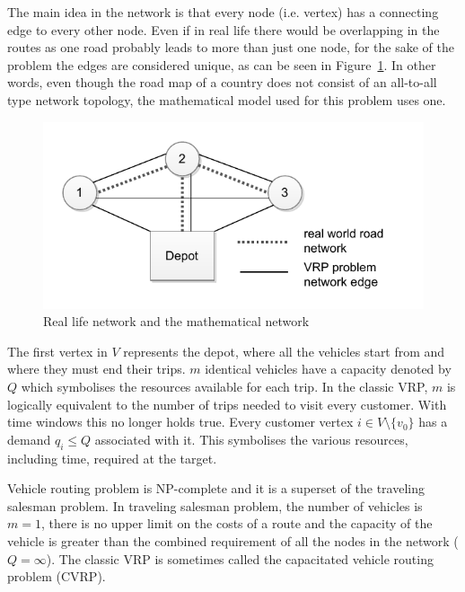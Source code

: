 The main idea in the network is that every node (i.e. vertex) has a connecting edge to every other node. Even if in real life there would be overlapping in the routes as one road probably leads to more than just one node, for the sake of the problem the edges are considered unique, as can be seen in Figure~\ref{fig:reallifenetwork}. In other words, even though the road map of a country does not consist of an all-to-all type network topology, the mathematical model used for this problem uses one. 

\begin{figure}[h]
  \begin{center}
    \includegraphics{images/simplenetwork.pdf}
    \caption{Real life network and the mathematical network}
    \label{fig:reallifenetwork}
  \end{center}
\end{figure}

The first vertex in $V$ represents the depot, where all the vehicles start from and where they must end their trips. $m$ identical vehicles have a capacity denoted by $Q$ which symbolises the resources available for each trip. In the classic VRP, $m$ is logically equivalent to the number of trips needed to visit every customer. With time windows this no longer holds true. Every customer vertex $i \in V\setminus\{v_0\}$ has a demand $q_i \leq Q$ associated with it. This symbolises the various resources, including time, required at the target. \cite{laporte2007you}

Vehicle routing problem is NP-complete and it is a superset of the traveling salesman problem. In traveling salesman problem, the number of vehicles is $m = 1$, there is no upper limit on the costs of a route and the capacity of the vehicle is greater than the combined requirement of all the nodes in the network ($Q = \infty$). \cite{laporte2007you} The classic VRP is sometimes called the capacitated vehicle routing problem (CVRP). \cite{hassanzadeh2009location}


